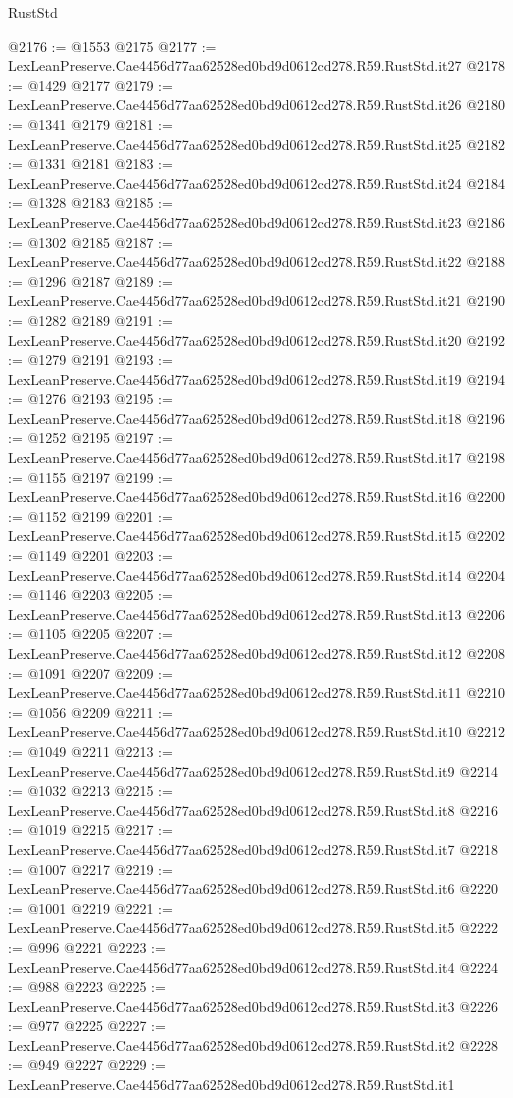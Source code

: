 \begin{lexlean}{RustStd}
\begin{coremodule}
@2176 := @1553 @2175
@2177 := LexLeanPreserve.Cae4456d77aa62528ed0bd9d0612cd278.R59.RustStd.it27
@2178 := @1429 @2177
@2179 := LexLeanPreserve.Cae4456d77aa62528ed0bd9d0612cd278.R59.RustStd.it26
@2180 := @1341 @2179
@2181 := LexLeanPreserve.Cae4456d77aa62528ed0bd9d0612cd278.R59.RustStd.it25
@2182 := @1331 @2181
@2183 := LexLeanPreserve.Cae4456d77aa62528ed0bd9d0612cd278.R59.RustStd.it24
@2184 := @1328 @2183
@2185 := LexLeanPreserve.Cae4456d77aa62528ed0bd9d0612cd278.R59.RustStd.it23
@2186 := @1302 @2185
@2187 := LexLeanPreserve.Cae4456d77aa62528ed0bd9d0612cd278.R59.RustStd.it22
@2188 := @1296 @2187
@2189 := LexLeanPreserve.Cae4456d77aa62528ed0bd9d0612cd278.R59.RustStd.it21
@2190 := @1282 @2189
@2191 := LexLeanPreserve.Cae4456d77aa62528ed0bd9d0612cd278.R59.RustStd.it20
@2192 := @1279 @2191
@2193 := LexLeanPreserve.Cae4456d77aa62528ed0bd9d0612cd278.R59.RustStd.it19
@2194 := @1276 @2193
@2195 := LexLeanPreserve.Cae4456d77aa62528ed0bd9d0612cd278.R59.RustStd.it18
@2196 := @1252 @2195
@2197 := LexLeanPreserve.Cae4456d77aa62528ed0bd9d0612cd278.R59.RustStd.it17
@2198 := @1155 @2197
@2199 := LexLeanPreserve.Cae4456d77aa62528ed0bd9d0612cd278.R59.RustStd.it16
@2200 := @1152 @2199
@2201 := LexLeanPreserve.Cae4456d77aa62528ed0bd9d0612cd278.R59.RustStd.it15
@2202 := @1149 @2201
@2203 := LexLeanPreserve.Cae4456d77aa62528ed0bd9d0612cd278.R59.RustStd.it14
@2204 := @1146 @2203
@2205 := LexLeanPreserve.Cae4456d77aa62528ed0bd9d0612cd278.R59.RustStd.it13
@2206 := @1105 @2205
@2207 := LexLeanPreserve.Cae4456d77aa62528ed0bd9d0612cd278.R59.RustStd.it12
@2208 := @1091 @2207
@2209 := LexLeanPreserve.Cae4456d77aa62528ed0bd9d0612cd278.R59.RustStd.it11
@2210 := @1056 @2209
@2211 := LexLeanPreserve.Cae4456d77aa62528ed0bd9d0612cd278.R59.RustStd.it10
@2212 := @1049 @2211
@2213 := LexLeanPreserve.Cae4456d77aa62528ed0bd9d0612cd278.R59.RustStd.it9
@2214 := @1032 @2213
@2215 := LexLeanPreserve.Cae4456d77aa62528ed0bd9d0612cd278.R59.RustStd.it8
@2216 := @1019 @2215
@2217 := LexLeanPreserve.Cae4456d77aa62528ed0bd9d0612cd278.R59.RustStd.it7
@2218 := @1007 @2217
@2219 := LexLeanPreserve.Cae4456d77aa62528ed0bd9d0612cd278.R59.RustStd.it6
@2220 := @1001 @2219
@2221 := LexLeanPreserve.Cae4456d77aa62528ed0bd9d0612cd278.R59.RustStd.it5
@2222 := @996 @2221
@2223 := LexLeanPreserve.Cae4456d77aa62528ed0bd9d0612cd278.R59.RustStd.it4
@2224 := @988 @2223
@2225 := LexLeanPreserve.Cae4456d77aa62528ed0bd9d0612cd278.R59.RustStd.it3
@2226 := @977 @2225
@2227 := LexLeanPreserve.Cae4456d77aa62528ed0bd9d0612cd278.R59.RustStd.it2
@2228 := @949 @2227
@2229 := LexLeanPreserve.Cae4456d77aa62528ed0bd9d0612cd278.R59.RustStd.it1

\end{coremodule}
\end{lexlean}
